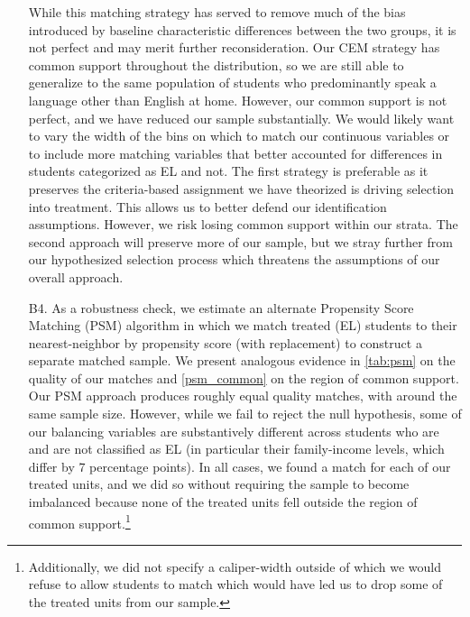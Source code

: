 \documentclass[a4paper, 11pt]{article}
\begin{document}
\begin{enumerate}
	While this matching strategy has served to remove much of the bias introduced by baseline characteristic differences between the two groups, it is not perfect and may merit further reconsideration. Our CEM strategy has common support throughout the distribution, so we are still able to generalize to the same population of students who predominantly speak a language other than English at home. However, our common support is not perfect, and we have reduced our sample substantially. We would likely want to vary the width of the bins on which to match our continuous variables or to include more matching variables that better accounted for differences in students categorized as EL and not. The first strategy is preferable as it preserves the criteria-based assignment we have theorized is driving selection into treatment. This allows us to better defend our identification assumptions. However, we risk losing common support within our strata. The second approach will preserve more of our sample, but we stray further from our hypothesized selection process which threatens the assumptions of our overall approach.

	\item[B4.] As a robustness check, we estimate an alternate Propensity Score Matching (PSM) algorithm in which we match treated (EL) students to their nearest-neighbor by propensity score (with replacement) to construct a separate matched sample. We present analogous evidence in \autoref{tab:psm} on the quality of our matches and \autoref{psm_common} on the region of common support. Our PSM approach produces roughly equal quality matches, with around the same sample size. However, while we fail to reject the null hypothesis, some of our balancing variables are substantively different across students who are and are not classified as EL (in particular their family-income levels, which differ by 7 percentage points). In all cases, we found a match for each of our treated units, and we did so without requiring the sample to become imbalanced because none of the treated units fell outside the region of common support.\footnote{Additionally, we did not specify a caliper-width outside of which we would refuse to allow students to match which would have led us to drop some of the treated units from our sample.}


\end{enumerate}
\end{document}
